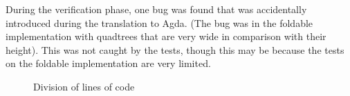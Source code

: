 During the verification phase, one bug was found that was accidentally introduced during the translation to Agda. (The bug was in the foldable implementation with quadtrees that are very wide in comparison with their height). This was not caught by the tests, though this may be because the tests on the foldable implementation are very limited.

\begin{figure}
	\caption{Division of lines of code}
	\label{division}
\end{figure}